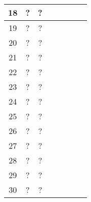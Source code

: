 \begin{longtable}[c]{|c|c|c|c|c|c|c|c|}
    \multirow{1}{*}{18} & \multirow{1}{*}{?} & \multirow{1}{*}{?} & & & & & \\\hline
    \multirow{1}{*}{19} & \multirow{1}{*}{?} & \multirow{1}{*}{?} & & & & & \\\hline
    \multirow{1}{*}{20} & \multirow{1}{*}{?} & \multirow{1}{*}{?} & & & & & \\\hline
    \multirow{1}{*}{21} & \multirow{1}{*}{?} & \multirow{1}{*}{?} & & & & & \\\hline
    \multirow{1}{*}{22} & \multirow{1}{*}{?} & \multirow{1}{*}{?} & & & & & \\\hline
    \multirow{1}{*}{23} & \multirow{1}{*}{?} & \multirow{1}{*}{?} & & & & & \\\hline
    \multirow{1}{*}{24} & \multirow{1}{*}{?} & \multirow{1}{*}{?} & & & & & \\\hline
    \multirow{1}{*}{25} & \multirow{1}{*}{?} & \multirow{1}{*}{?} & & & & & \\\hline
    \multirow{1}{*}{26} & \multirow{1}{*}{?} & \multirow{1}{*}{?} & & & & & \\\hline
    \multirow{1}{*}{27} & \multirow{1}{*}{?} & \multirow{1}{*}{?} & & & & & \\\hline
    \multirow{1}{*}{28} & \multirow{1}{*}{?} & \multirow{1}{*}{?} & & & & & \\\hline
    \multirow{1}{*}{29} & \multirow{1}{*}{?} & \multirow{1}{*}{?} & & & & & \\\hline
    \multirow{1}{*}{30} & \multirow{1}{*}{?} & \multirow{1}{*}{?} & & & & & \\\hline
\end{longtable}
